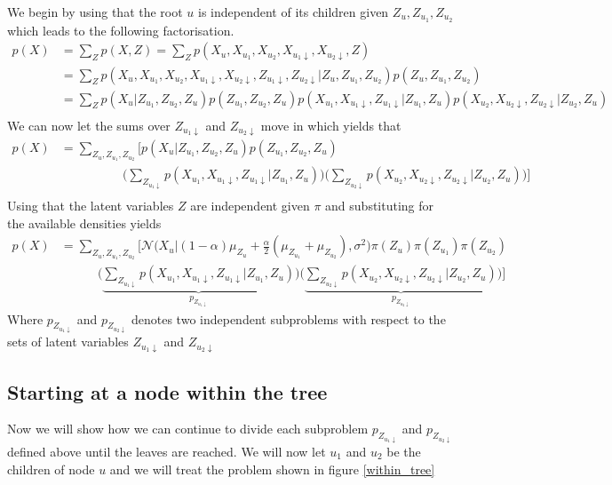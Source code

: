We begin by using that the root $u$ is independent of its children given $Z_u, Z_{u_1}, Z_{u_2}$ which leads to the following factorisation.
\begin{align}
  p(X) & = \sum_Z p(X,Z) = \sum_Z p(X_u, X_{u_1}, X_{u_2}, X_{u_1\downarrow}, X_{u_2\downarrow}, Z) \nonumber \\
  & = \sum_Z p(X_u, X_{u_1}, X_{u_2}, X_{u_1\downarrow}, X_{u_2\downarrow}, Z_{u_1\downarrow}, Z_{u_2\downarrow}| Z_u, Z_{u_1}, Z_{u_2})p(Z_u, Z_{u_1}, Z_{u_2}) \nonumber\\
  & = \sum_Z p(X_u|Z_{u_1}, Z_{u_2}, Z_u) p(Z_{u_1}, Z_{u_2}, Z_u)
  p(X_{u_1}, X_{u_1 \downarrow}, Z_{u_1 \downarrow}|Z_{u_1}, Z_u)
  p(X_{u_2}, X_{u_2 \downarrow}, Z_{u_2 \downarrow}|Z_{u_2}, Z_u) \nonumber\\
\end{align}
We can now let the sums over $Z_{u_1 \downarrow}$ and $Z_{u_2 \downarrow}$ move in which yields that
\begin{align}
  p(X) & = \sum_{Z_u, Z_{u_1}, Z_{u_2}}\bigg[p(X_u|Z_{u_1}, Z_{u_2}, Z_u) p(Z_{u_1}, Z_{u_2}, Z_u) \nonumber\\
  & \qquad\qquad\quad \Big(\sum_{Z_{u_1 \downarrow}} p(X_{u_1}, X_{u_1 \downarrow}, Z_{u_1 \downarrow}|Z_{u_1}, Z_u) \Big)\Big(\sum_{Z_{u_2 \downarrow}} p(X_{u_2}, X_{u_2 \downarrow}, Z_{u_2 \downarrow}|Z_{u_2}, Z_u) \Big)\bigg] \nonumber \\
\end{align}
Using that the latent variables $Z$ are independent given $\pi$ and substituting for the available densities yields
\begin{align}
  p(X) & = \sum_{Z_u, Z_{u_1}, Z_{u_2}}\bigg[\mathcal{N}\Big(X_u|(1-\alpha)\mu_{Z_u} +\frac{\alpha}{2}(\mu_{Z_{u_1}}+\mu_{Z_{u_2}}), \sigma^2 \Big) \pi(Z_u) \pi(Z_{u_1}) \pi(Z_{u_2})\\
  & \qquad\quad
  \Big(\underbrace{\sum_{Z_{u_1 \downarrow}} p(X_{u_1}, X_{u_1 \downarrow}, Z_{u_1 \downarrow}|Z_{u_1}, Z_u)}_\text{$p_{Z_{u_1 \downarrow}}$} \Big)
  \Big(\underbrace{\sum_{Z_{u_2 \downarrow}} p(X_{u_2}, X_{u_2 \downarrow}, Z_{u_2 \downarrow}|Z_{u_2}, Z_u)}_\text{$p_{Z_{u_2 \downarrow}}$} \Big) \bigg]
\end{align}
Where $p_{Z_{u_1 \downarrow}}$ and $p_{Z_{u_2 \downarrow}}$ denotes two independent subproblems with respect to the sets of latent variables $Z_{u_1 \downarrow}$ and $Z_{u_2 \downarrow}$

\subsection*{Starting at a node within the tree}
Now we will show how we can continue to divide each subproblem $p_{Z_{u_1 \downarrow}}$ and $p_{Z_{u_2 \downarrow}}$ defined above until the leaves are reached. We will now let $u_{1}$ and $u_{2}$ be the children of node $u$ and we will treat the problem shown in figure \ref{within_tree}


